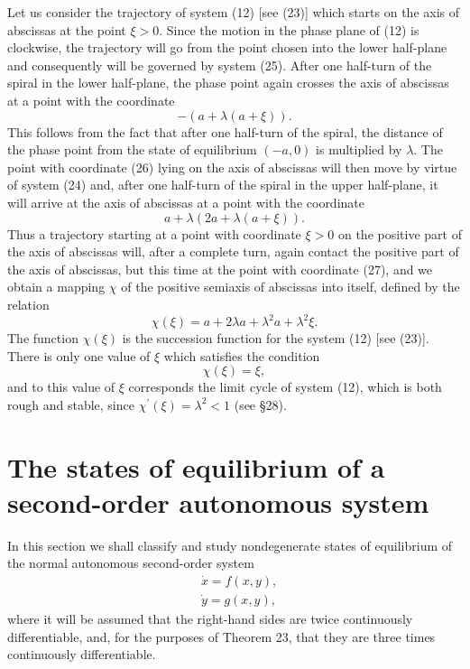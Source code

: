 \documentclass[10pt,a5paper]{book}
\theoremstyle{plain}
\theoremstyle{definition}
\theoremstyle{remark}
\begin{document}
Let us consider the trajectory of system (12) [see (23)] which starts on the axis of abscissas at the point $\xi>0$. Since the motion in the phase plane of (12) is clockwise, the trajectory will go from the point chosen into the lower half-plane and consequently will be governed by system (25). After one half-turn of the spiral in the lower half-plane, the phase point again crosses the axis of abscissas at a point with the coordinate
\begin{equation*}
-(a+\lambda(a+\xi)) . \tag{26}
\end{equation*}
This follows from the fact that after one half-turn of the spiral, the distance of the phase point from the state of equilibrium $(-a, 0)$ is multiplied by $\lambda$. The point with coordinate (26) lying on the axis of abscissas will then move by virtue of system (24) and, after one half-turn of the spiral in the upper half-plane, it will arrive at the axis of abscissas at a point with the coordinate
\begin{equation*}
a+\lambda(2 a+\lambda(a+\xi)) . \tag{27}
\end{equation*}
Thus a trajectory starting at a point with coordinate $\xi>0$ on the positive part of the axis of abscissas will, after a complete turn, again contact the positive part of the axis of abscissas, but this time at the point with coordinate (27), and we obtain a mapping $\chi$ of the positive semiaxis of abscissas into itself, defined by the relation
\[
\chi(\xi)=a+2 \lambda a+\lambda^{2} a+\lambda^{2} \xi .
\]
The function $\chi(\xi)$ is the succession function for the system (12) [see (23)]. There is only one value of $\xi$ which satisfies the condition
\[
\chi(\xi)=\xi,
\]
and to this value of $\xi$ corresponds the limit cycle of system (12), which is both rough and stable, since $\chi^{\prime}(\xi)=\lambda^{2}<1$ (see §28).

\section{The states of equilibrium of a second-order autonomous system}
In this section we shall classify and study nondegenerate states of equilibrium of the normal autonomous second-order system
\begin{align*}
& \dot{x}=f(x, y),  \tag{1}\\
& \dot{y}=g(x, y),
\end{align*}
where it will be assumed that the right-hand sides are twice continuously differentiable, and, for the purposes of Theorem 23, that they are three times continuously differentiable.
\end{document}
